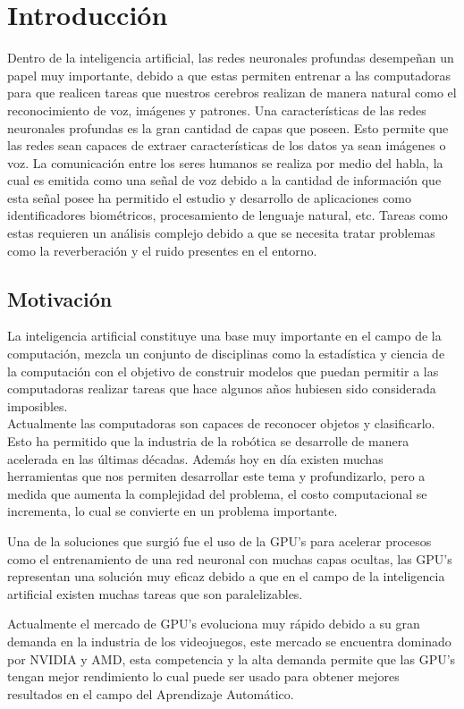 \chapter{Introducción}
Dentro de la inteligencia artificial, las redes neuronales profundas desempeñan un papel muy importante, debido a que estas permiten entrenar a las computadoras para que realicen tareas que nuestros cerebros realizan de manera natural como el reconocimiento de voz, imágenes y patrones. Una características de las redes neuronales profundas es la gran cantidad de capas que poseen. Esto permite que las redes sean capaces de extraer características de los datos ya sean imágenes o voz. La comunicación entre los seres humanos se realiza por medio del habla, la cual es emitida como una señal de voz debido a la cantidad de información que esta señal posee ha permitido el estudio y desarrollo de aplicaciones como identificadores biométricos, procesamiento de lenguaje natural, etc. Tareas como estas requieren un análisis complejo debido a que se necesita tratar problemas como la reverberación y el ruido presentes en el entorno.




\section{Motivación}
La inteligencia artificial constituye una base muy importante en el campo de la computación, mezcla un conjunto de disciplinas como la estadística y ciencia de la computación con el objetivo de construir modelos que puedan permitir a las computadoras realizar tareas que hace algunos años hubiesen sido considerada imposibles.\\
Actualmente las computadoras son capaces de reconocer objetos y clasificarlo. Esto ha permitido que la industria de la robótica se desarrolle de manera acelerada en las últimas décadas.
 Además hoy en día existen muchas herramientas que nos permiten desarrollar este tema y profundizarlo, pero a medida que aumenta la complejidad del problema, el costo computacional se incrementa, lo cual se convierte en un problema importante.

 Una de la soluciones que surgió fue el uso de la GPU's para acelerar procesos como el entrenamiento de una red neuronal con muchas capas ocultas, las GPU's representan una solución muy eficaz debido a que en el campo de la inteligencia artificial existen muchas tareas que son paralelizables.

Actualmente el mercado de GPU's evoluciona muy rápido debido a su gran demanda en la industria de los videojuegos, este mercado se encuentra dominado por NVIDIA y AMD, esta competencia y la alta demanda permite que las GPU's tengan mejor rendimiento lo cual puede ser usado para obtener mejores resultados en el campo del Aprendizaje Automático. 

